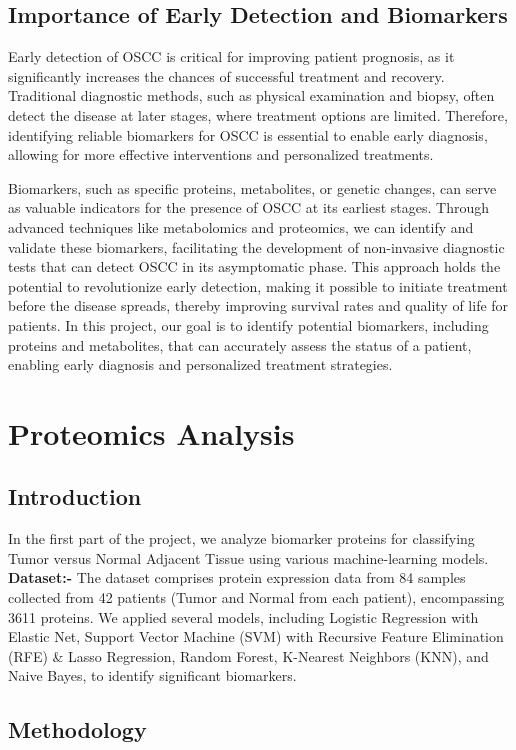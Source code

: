 \documentclass[a4paper,12pt]{article}
\begin{document}
\subsection{Importance of Early Detection and Biomarkers}
Early detection of OSCC is critical for improving patient prognosis, as it significantly increases the chances of successful treatment and recovery. Traditional diagnostic methods, such as physical examination and biopsy, often detect the disease at later stages, where treatment options are limited. Therefore, identifying reliable biomarkers for OSCC is essential to enable early diagnosis, allowing for more effective interventions and personalized treatments.

Biomarkers, such as specific proteins, metabolites, or genetic changes, can serve as valuable indicators for the presence of OSCC at its earliest stages. Through advanced techniques like metabolomics and proteomics, we can identify and validate these biomarkers, facilitating the development of non-invasive diagnostic tests that can detect OSCC in its asymptomatic phase. This approach holds the potential to revolutionize early detection, making it possible to initiate treatment before the disease spreads, thereby improving survival rates and quality of life for patients. In this project, our goal is to identify potential biomarkers, including proteins and metabolites, that can accurately assess the status of a patient, enabling early diagnosis and personalized treatment strategies.
\section{Proteomics Analysis}
\subsection{Introduction}
In the first part of the project, we analyze biomarker proteins for classifying Tumor versus Normal Adjacent Tissue using various machine-learning models.\\
\textbf{Dataset:-} The dataset comprises protein expression data from 84 samples collected from 42 patients (Tumor and Normal from each patient), encompassing 3611 proteins. We applied several models, including Logistic Regression with Elastic Net, Support Vector Machine (SVM) with Recursive Feature Elimination (RFE) \& Lasso Regression, Random Forest, K-Nearest Neighbors (KNN), and Naive Bayes, to identify significant biomarkers.

\subsection{Methodology}
\end{document}
